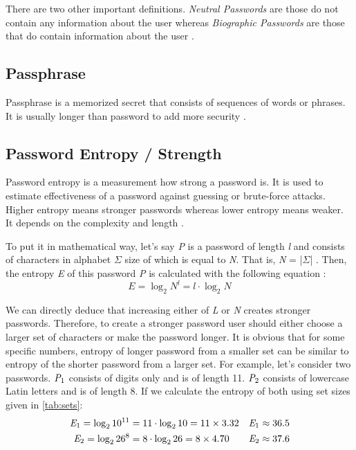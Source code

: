 \documentclass[acmsmall,nonacm]{acmart}
\begin{document}
There are two other important definitions. \emph{Neutral Passwords} are those do not contain any information about the user whereas \emph{Biographic Passwords} are those that do contain information about the user \cite{Kavrestad_2019}.

\subsection{Passphrase} \label{passphrase}

Passphrase is a memorized secret that consists of sequences of words or phrases. It is usually longer than password to add more security \cite{passphrase_def}.

\subsection{Password Entropy / Strength} \label{entropy}
Password entropy is a measurement how strong a password is. It is used to estimate effectiveness of a password against guessing or brute-force attacks. Higher entropy means stronger passwords whereas lower entropy means weaker. It depends on the complexity and length \cite{hu_2018}.\newline 

To put it in mathematical way, let's say \emph{P} is a password of length \emph{l} and consists of characters in alphabet $\Sigma$ size of which is equal to \emph{N}. That is, \emph{N} = |$\Sigma$| . Then, the entropy \emph{E} of this password \emph{P} is calculated with the following equation :
\begin{equation} \label{eq:1}
E = \log_2 N^l = l \cdot \log_2 N
\end{equation}

We can directly deduce that increasing either of \emph{L} or \emph{N} creates stronger passwords. Therefore, to create a stronger password user should either choose a larger set of characters or make the password longer. It is obvious that for some specific numbers, entropy of longer password from a smaller set can be similar to entropy of the shorter password from a larger set. For example, let's consider two passwords. $\emph{P}_1$ consists of digits only and is of length 11. $\emph{P}_2$ consists of lowercase Latin letters and is of length 8. If we calculate the entropy of both using set sizes given in \autoref{tab:sets}:
\begin{align*}\label{eq:p1p2calc}
    \emph{E}_1 = \log_2 10^{11} &= 11 \cdot \log_2 10 = 11 \times 3.32 &\emph{E}_1 \approx 36.5 \\
    \emph{E}_2 = \log_2 26^8  &= 8  \cdot \log_2 26   = 8 \times 4.70 &\emph{E}_2 \approx 37.6
\end{align*}
\end{document}
